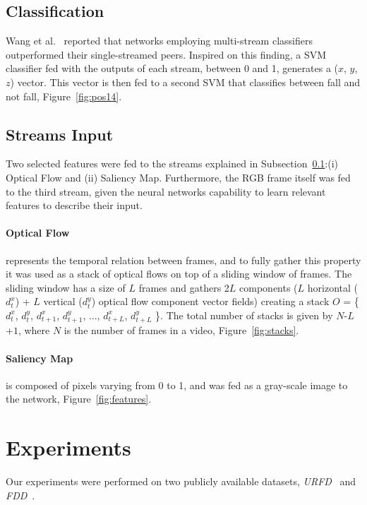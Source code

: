 \documentclass[conference]{IEEEtran}
\begin{document}
{\subsection{Classification}
\label{sec:classification}

Wang et al.~\cite{wang2015towards} reported that networks employing multi-stream classifiers outperformed their single-streamed peers. Inspired on this finding, a SVM classifier fed with the outputs of each stream, between 0 and 1, generates a ($x$, $y$, $z$) vector. This vector is then fed to a second SVM that classifies between fall and not fall, Figure~\ref{fig:pos14}.

\subsection{Streams Input}

Two selected features were fed to the streams explained in Subsection~\ref{sec:classification}:(i) Optical Flow and (ii) Saliency Map. Furthermore, the RGB frame itself was fed to the third stream, given the neural networks capability to learn relevant features to describe their input.

\paragraph{Optical Flow} represents the temporal relation between frames, and to fully gather this property it was used as a stack of optical flows on top of a sliding window of frames. The sliding window has a size of $L$ frames and gathers 2$L$ components ($L$ horizontal ($d_t^x$) + $L$ vertical ($d_t^y$) optical flow component vector fields) creating a stack $O$ = \{$d_t^x$, $d_t^y$, $d_{t+1}^x$, $d_{t+1}^y$, ..., $d_{t+L}^x$, $d_{t+L}^y$ \}. The total number of stacks is given by $N$-$L$+$1$, where $N$ is the number of frames in a video, Figure~\ref{fig:stacks}. 
\paragraph{Saliency Map} is composed of pixels varying from 0 to 1, and was fed as a gray-scale image to the network, Figure~\ref{fig:features}.

\section{Experiments}
\label{sec:experiments}

Our experiments were performed on two publicly available datasets, \textit{URFD}~\cite{kepski2014human} and \textit{FDD}~\cite{charfi2013optimised}.

}
\end{document}
